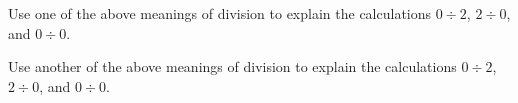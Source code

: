 \documentclass{ximera}
\begin{document}
%
%
%
%
%
%
%
%
%

\newpage
\begin{problem}[2.5in]
Use one of the above meanings of division to explain the calculations $0\div 2$, $2\div 0$, and $0\div 0$.  
\begin{freeResponse}
\end{freeResponse}
\end{problem}

\begin{problem}[2.5in]
Use another of the above meanings of division to explain the calculations $0\div 2$, $2\div 0$, and $0\div 0$.  
\begin{freeResponse}
\end{freeResponse}
\end{problem}
\end{document}
